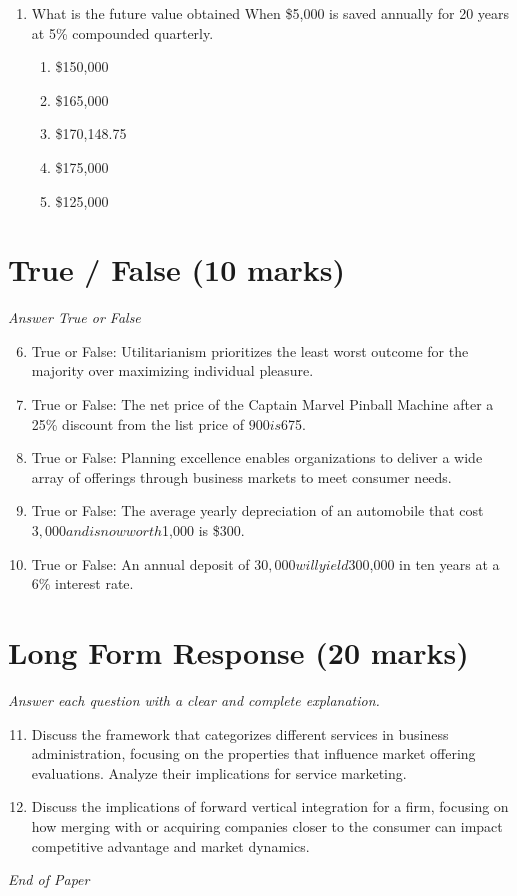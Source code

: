 \documentclass[12pt]{article}
\begin{document}
\begin{enumerate}[label=\arabic*.]
\begin{enumerate}[label=(\alph*)]
    \item Franklin D. Roosevelt
    \item Martin Luther King Jr.
    \item Mikhail Gorbachov
\end{enumerate}
\item What is the future value obtained When \$5,000 is saved annually for 20 years at 5\% compounded quarterly.
\begin{enumerate}[label=(\alph*)]
    \item \$150,000
    \item \$165,000
    \item \$170,148.75
    \item \$175,000
    \item \$125,000
\end{enumerate}
\end{enumerate}

\section*{True / False (10 marks)}
\textit{Answer True or False}
\begin{enumerate}[label=\arabic*.]
\setcounter{enumi}{5}
\item True or False: Utilitarianism prioritizes the least worst outcome for the majority over maximizing individual pleasure.
\item True or False: The net price of the Captain Marvel Pinball Machine after a 25\% discount from the list price of $900 is $675.
\item True or False: Planning excellence enables organizations to deliver a wide array of offerings through business markets to meet consumer needs.
\item True or False: The average yearly depreciation of an automobile that cost $3,000 and is now worth $1,000 is \$300.
\item True or False: An annual deposit of $30,000 will yield $300,000 in ten years at a 6\% interest rate.
\end{enumerate}

\section*{Long Form Response (20 marks)}
\textit{Answer each question with a clear and complete explanation.}
\begin{enumerate}[label=\arabic*.]
\setcounter{enumi}{10}
\item Discuss the framework that categorizes different services in business administration, focusing on the properties that influence market offering evaluations. Analyze their implications for service marketing.
\item Discuss the implications of forward vertical integration for a firm, focusing on how merging with or acquiring companies closer to the consumer can impact competitive advantage and market dynamics.
\end{enumerate}

\vfill
\noindent\textit{End of Paper}
\end{document}
